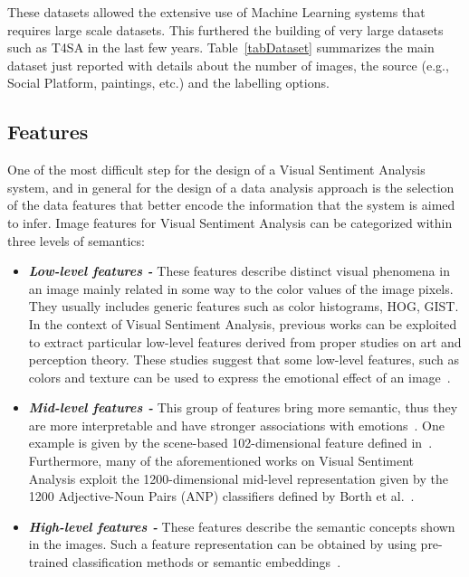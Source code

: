 These datasets allowed the extensive use of Machine Learning systems that requires large scale datasets. This furthered the building of very large datasets such as T4SA in the last few years.
Table~\ref{tabDataset} summarizes the main dataset just reported with details about the number of images, the source (e.g., Social Platform, paintings, etc.) and the labelling options.

\subsection{Features}
One of the most difficult step for the design of a Visual Sentiment Analysis system, and in general for the design of a data analysis approach is the selection of the data features that better encode the information that the system is aimed to infer.
Image features for Visual Sentiment Analysis can be categorized within three levels of semantics:
\begin{itemize}
	\item \textit{\textbf{Low-level features - }} These features describe distinct visual phenomena in an image mainly related in some way to the color values of the image pixels. They usually includes generic features such as color histograms, HOG, GIST. In the context of Visual Sentiment Analysis, previous works can be exploited to extract particular low-level features derived from proper studies on art and perception theory. These studies suggest that some low-level features, such as colors and texture can be used to express the emotional effect of an image~\cite{machajdik2010affective}.
	\item \textit{\textbf{Mid-level features - }}This group of features bring more semantic, thus they are more interpretable and have stronger associations with emotions~\cite{zhao2014exploring}. One example is given by the scene-based 102-dimensional feature defined in~\cite{yuan2013sentribute}. Furthermore, many of the aforementioned works on Visual Sentiment Analysis exploit 
	the 1200-dimensional mid-level representation given by the 1200 Adjective-Noun Pairs (ANP) classifiers defined by Borth et al.~\cite{borth2013large}.
	\item \textit{\textbf{High-level features - }} These features describe the semantic concepts shown in the images. Such a feature representation can be obtained by using pre-trained classification methods or semantic embeddings~\cite{katsurai2016image}.
\end{itemize}

